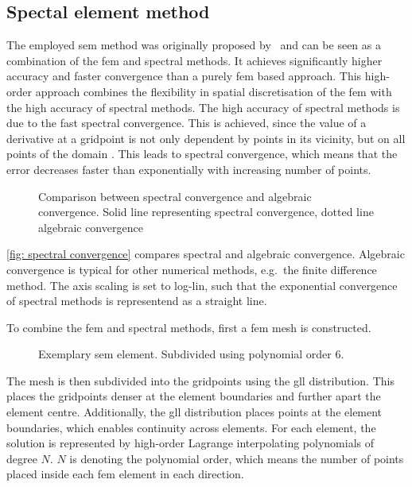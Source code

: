 \subsection{Spectal element method}
The employed \acrshort{sem} method was originally proposed by~\cite{pateraSpectralElementMethod1984} and can be seen as a combination of the \acrfull{fem} and spectral methods.
It achieves significantly higher accuracy and faster convergence than a purely \acrshort{fem} based approach. 
This high-order approach combines the flexibility in spatial discretisation of the \acrshort{fem} with the high accuracy of spectral methods.
The high accuracy of spectral methods is due to the fast spectral convergence.
This is achieved, since the  value of a derivative at a gridpoint is not only dependent by points in its vicinity, but on all points of the domain .
This leads to spectral convergence, which means that the error decreases faster than exponentially with increasing number of points.
\begin{figure}
    \centering
    
    \caption{Comparison between spectral convergence and algebraic convergence. Solid line representing spectral convergence, dotted line algebraic convergence}
    \label{fig: spectral convergence}
\end{figure}
\autoref{fig: spectral convergence} compares spectral and algebraic convergence. 
Algebraic convergence is typical for other numerical methods, e.g.\ the finite difference method.
The axis scaling is set to log-lin, such that the exponential convergence of spectral methods is representend as a straight line. 

To combine the \acrshort{fem} and spectral methods, first a \acrshort{fem} mesh is constructed. 
\begin{figure}
    \centering
    
    \caption{Exemplary \acrshort{sem} element. Subdivided using polynomial order 6.}
    \label{fig: SEM element}
\end{figure}
The mesh is then subdivided into the gridpoints using the \acrfull{gll} distribution.
This places the gridpoints denser at the element boundaries and further apart the element centre.
Additionally, the \acrshort{gll} distribution places points at the element boundaries, which enables continuity across elements.
For each element, the solution is represented by high-order Lagrange interpolating polynomials of degree $N$. 
$N$ is denoting the polynomial order, which means the number of points placed inside each \acrshort{fem} element in each direction.

